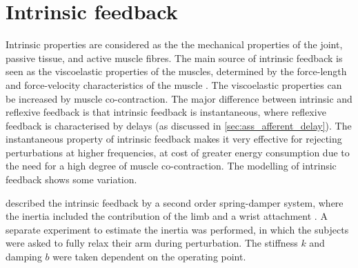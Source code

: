 





\section{Intrinsic feedback} \label{sec:ass_intrinsic}
Intrinsic properties are considered as the the mechanical properties of the joint, passive tissue, and active muscle fibres. The main source of intrinsic feedback is seen as the viscoelastic properties of the muscles, determined by the force-length and force-velocity characteristics of the muscle \cite{winter_biomechanics_1988}. The viscoelastic properties can be increased by muscle co-contraction. The major difference between intrinsic and reflexive feedback is that intrinsic feedback is instantaneous, where reflexive feedback is characterised by delays (as discussed in \autoref{sec:ass_afferent_delay}). The instantaneous property of intrinsic feedback makes it very effective for rejecting perturbations at higher frequencies, at cost of greater energy consumption due to the need for a high degree of muscle co-contraction. The modelling of intrinsic feedback shows some variation. 

% 
\citeauthor{zhang_simultaneous_1997} described the intrinsic feedback by a second order spring-damper system, where the inertia included the contribution of the limb and a wrist attachment \cite{zhang_simultaneous_1997}. A separate experiment to estimate the inertia was performed, in which the subjects were asked to fully relax their arm during perturbation. The stiffness $k$ and damping $b$ were taken dependent on the operating point.
 
